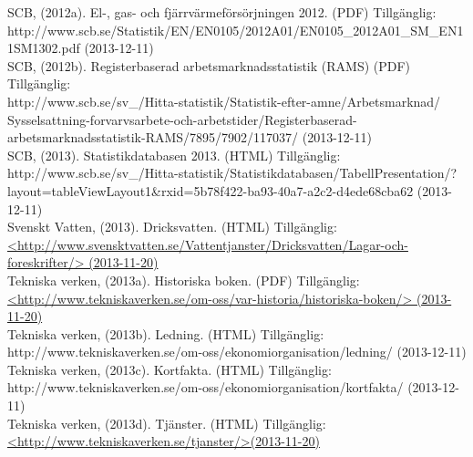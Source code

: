 \documentclass[10pt,a4paper]{article}
\begin{document}
SCB, (2012a). El-, gas- och fjärrvärmeförsörjningen 2012. (PDF) Tillgänglig:\\
http://www.scb.se/Statistik/EN/EN0105/2012A01/EN0105\_2012A01\_SM\_EN11SM1302.pdf (2013-12-11)\\

SCB, (2012b). Registerbaserad arbetsmarknadsstatistik (RAMS) (PDF) Tillgänglig:\\
http://www.scb.se/sv\_/Hitta-statistik/Statistik-efter-amne/Arbetsmarknad/ \\Sysselsattning-forvarvsarbete-och-arbetstider/Registerbaserad-arbetsmarknadsstatistik-RAMS/7895/7902/117037/ (2013-12-11)\\

SCB, (2013). Statistikdatabasen 2013. (HTML) Tillgänglig:\\
http://www.scb.se/sv\_/Hitta-statistik/Statistikdatabasen/TabellPresentation/?\\layout=tableViewLayout1\&rxid=5b78f422-ba93-40a7-a2c2-d4ede68cba62 (2013-12-11)\\

Svenskt Vatten, (2013). Dricksvatten. (HTML) Tillgänglig: \\
\hyperref{http://www.svensktvatten.se/Vattentjanster/Dricksvatten/Lagar-och-foreskrifter/}{}{}{<http://www.svensktvatten.se/Vattentjanster/Dricksvatten/Lagar-och-foreskrifter/>
(2013-11-20)} \\

Tekniska verken, (2013a). Historiska boken. (PDF) Tillgänglig: \\
\hyperref{http://www.tekniskaverken.se/om-oss/var-historia/historiska-boken/}{}{}{<http://www.tekniskaverken.se/om-oss/var-historia/historiska-boken/> (2013-11-20)}\\

Tekniska verken, (2013b). Ledning. (HTML) Tillgänglig: \\
http://www.tekniskaverken.se/om-oss/ekonomiorganisation/ledning/ (2013-12-11)\\

Tekniska verken, (2013c). Kortfakta. (HTML) Tillgänglig: \\
http://www.tekniskaverken.se/om-oss/ekonomiorganisation/kortfakta/ (2013-12-11)\\

Tekniska verken, (2013d). Tjänster. (HTML) Tillgänglig: \\
\hyperref{http://www.tekniskaverken.se/tjanster/}{}{}{<http://www.tekniskaverken.se/tjanster/>(2013-11-20)}\\
\end{document}
